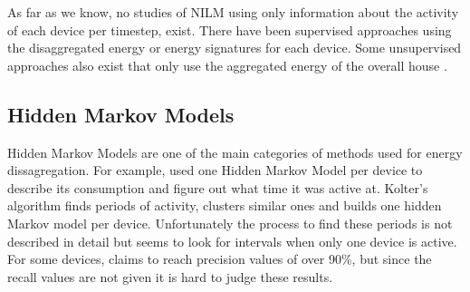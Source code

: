 \documentclass{article}
\begin{document}
As far as we know, no studies of NILM using only information about the activity of each device per timestep, exist.
There have been supervised approaches using the disaggregated energy\cite{Kelly} or energy signatures \cite{Parson} for each device.
Some unsupervised approaches also exist that only use the aggregated energy of the overall house \cite{Kolter}.




\subsection{Hidden Markov Models}
Hidden Markov Models are one of the main categories of methods used for energy dissagregation.
For example, \cite{Kolter} used one Hidden Markov Model per device to describe its consumption and figure out what time 
it was active at. Kolter's algorithm finds periods of activity, clusters similar ones and builds one hidden Markov model per device. 
Unfortunately the process to find these periods is not described in detail but seems to look for intervals when only 
one device is active. For some devices, \cite{} claims to reach precision values of over 90\%, but since the recall values are not 
given it is hard to judge these results. 
\end{document}
